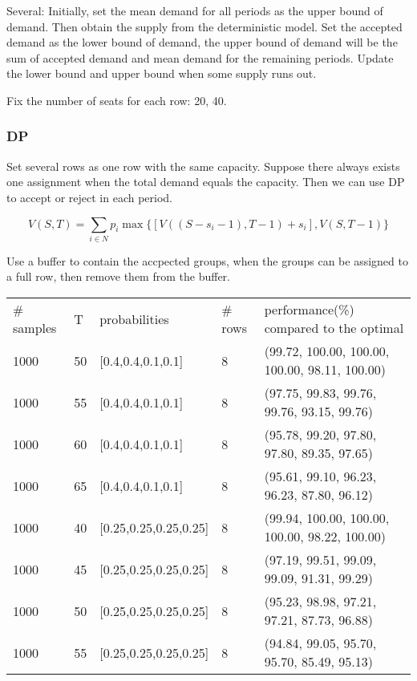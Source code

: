 Several: Initially, set the mean demand for all periods as the upper bound of demand. Then obtain the supply from the deterministic model. Set the accepted demand as the lower bound of demand, the upper bound of demand will be the sum of accepted demand and mean demand for the remaining periods. Update the lower bound and upper bound when some supply runs out.



Fix the number of seats for each row: 20, 40.


\subsubsection*{DP}
Set several rows as one row with the same capacity.
Suppose there always exists one assignment when the total demand equals the capacity.
Then we can use DP to accept or reject in each period.

$$V(S,T) = \sum_{i \in N} p_i \max\{ {[V((S-s_i-1),T-1)+ s_i]}, {V(S,T-1)}\}$$

Use a buffer to contain the accpected groups, when the groups can be assigned to a full row, then remove them from the buffer.

\begin{table}[ht]
  \begin{tabular}{l|l|l|l|l}
  \hline
  \# samples & T & probabilities & \# rows & performance(\%) compared to the optimal \\
  1000  & 50  & [0.4,0.4,0.1,0.1] & 8 & (99.72, 100.00, 100.00, 100.00, 98.11, 100.00) \\
  1000  & 55  & [0.4,0.4,0.1,0.1] & 8 & (97.75, 99.83, 99.76, 99.76, 93.15, 99.76) \\ %
  1000  & 60  & [0.4,0.4,0.1,0.1] & 8 & (95.78, 99.20, 97.80, 97.80, 89.35, 97.65) \\
  1000  & 65  & [0.4,0.4,0.1,0.1] & 8 & (95.61, 99.10, 96.23, 96.23, 87.80, 96.12) \\
  \hline
  1000  & 40  & [0.25,0.25,0.25,0.25] & 8 & (99.94, 100.00, 100.00, 100.00, 98.22, 100.00) \\
  1000  & 45  & [0.25,0.25,0.25,0.25] & 8 & (97.19, 99.51, 99.09, 99.09, 91.31, 99.29) \\
  1000  & 50  & [0.25,0.25,0.25,0.25] & 8 & (95.23, 98.98, 97.21, 97.21, 87.73, 96.88) \\
  1000  & 55  & [0.25,0.25,0.25,0.25] & 8 & (94.84, 99.05, 95.70, 95.70, 85.49, 95.13) \\
  \hline
  \end{tabular}
\end{table}

